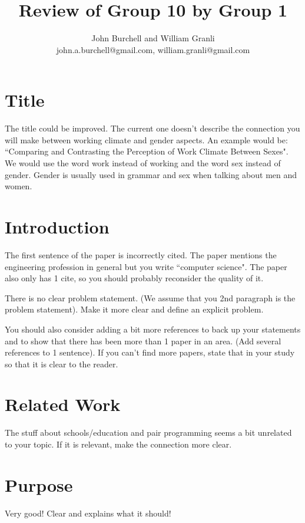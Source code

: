\documentclass[times, 10pt,twocolumn]{article}
\begin{document}
\title{Review of Group 10 by Group 1}

\author{John Burchell and William Granli \\
john.a.burchell@gmail.com, william.granli@gmail.com}



\maketitle
\thispagestyle{empty}

\section{Title}

The title could be improved. The current one doesn't describe the connection you will make between working climate and gender aspects. An example would be: ``Comparing and Contrasting the Perception of Work Climate Between Sexes". We would use the word work instead of working and the  word sex instead of gender. Gender is usually used in grammar and sex when talking about men and women. 

\section{Introduction}
The first sentence of the paper is incorrectly cited. The paper mentions the engineering profession in general but you write ``computer science". The paper also only has 1 cite, so you should probably reconsider the quality of it. 

There is no clear problem statement. (We assume that you 2nd paragraph is the problem statement). Make it more clear and define an explicit problem.

You should also consider adding a bit more references to back up your statements and to show that there has been more than 1 paper in an area. (Add several references to 1 sentence). If you can't find more papers, state that in your study so that it is clear to the reader. 

\section{Related Work}
The stuff about schools/education and pair programming seems a bit unrelated to your topic. If it is relevant, make the connection more clear.

\section{Purpose}
Very good! Clear and explains what it should!
\end{document}
